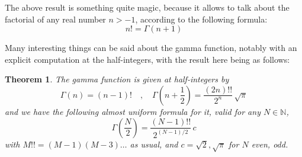 \documentclass[12pt]{amsbook}
\newtheorem{theorem}{Theorem}[chapter]
\begin{document}
The above result is something quite magic, because it allows to talk about the factorial of any real number $n>-1$, according to the following formula:
$$n!=\Gamma(n+1)$$

Many interesting things can be said about the gamma function, notably with an explicit computation at the half-integers, with the result here being as follows:


\begin{theorem}
The gamma function is given at half-integers by
$$\Gamma(n)=(n-1)!\quad,\quad\Gamma\left(n+\frac{1}{2}\right)=\frac{(2n)!!}{2^n}\,\sqrt{\pi}$$
and we have the following almost uniform formula for it, valid for any $N\in\mathbb N$,
$$\Gamma\left(\frac{N}{2}\right)=\frac{(N-1)!!}{2^{(N-1)/2}}\,c$$
with $M!!=(M-1)(M-3)\ldots$ as usual, and $c=\sqrt{2},\sqrt{\pi}$ for $N$ even, odd.
\end{theorem}
\end{document}
